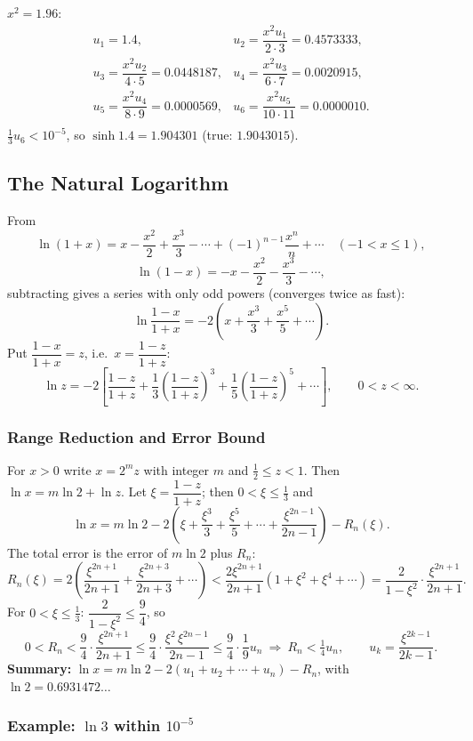\documentclass[hidelinks]{article}
\begin{document}
$x^2=1.96$:
\[
\begin{array}{ll}
u_1=1.4, & u_2=\dfrac{x^2u_1}{2\cdot3}=0.4573333,\\[4pt]
u_3=\dfrac{x^2u_2}{4\cdot5}=0.0448187, & u_4=\dfrac{x^2u_3}{6\cdot7}=0.0020915,\\[4pt]
u_5=\dfrac{x^2u_4}{8\cdot9}=0.0000569, & u_6=\dfrac{x^2u_5}{10\cdot11}=0.0000010.\\
\end{array}
\]
$\tfrac13u_6<10^{-5}$, so $\sinh1.4=1.904301$ (true: $1.9043015$).

\subsection{The Natural Logarithm}

From
\[
\ln(1+x)=x-\frac{x^2}2+\frac{x^3}3-\cdots+(-1)^{n-1}\frac{x^n}n+\cdots\quad(-1<x\le1),
\]
\[
\ln(1-x)=-x-\frac{x^2}2-\frac{x^3}3-\cdots,
\]
subtracting gives a series with only odd powers (converges twice as fast):
\[
\ln\frac{1-x}{1+x}=-2\left(x+\frac{x^3}3+\frac{x^5}5+\cdots\right).
\]
Put $\dfrac{1-x}{1+x}=z$, i.e.\ $x=\dfrac{1-z}{1+z}$:
\[
\ln z=-2\left[\frac{1-z}{1+z}+\frac13\left(\frac{1-z}{1+z}\right)^3+\frac15\left(\frac{1-z}{1+z}\right)^5+\cdots\right],\qquad 0<z<\infty .
\]

\subsubsection{Range Reduction and Error Bound}

For $x>0$ write $x=2^m z$ with integer $m$ and $\frac12\le z<1$. Then $\ln x=m\ln2+\ln z$. Let $\xi=\dfrac{1-z}{1+z}$; then $0<\xi\le\frac13$ and
\[
\ln x=m\ln2-2\left(\xi+\frac{\xi^3}3+\frac{\xi^5}5+\cdots+\frac{\xi^{2n-1}}{2n-1}\right)-R_n(\xi).
\]
The total error is the error of $m\ln2$ plus $R_n$:
\[
R_n(\xi)=2\left(\frac{\xi^{2n+1}}{2n+1}+\frac{\xi^{2n+3}}{2n+3}+\cdots\right)
<\frac{2\xi^{2n+1}}{2n+1}(1+\xi^2+\xi^4+\cdots)=\frac{2}{1-\xi^2}\cdot\frac{\xi^{2n+1}}{2n+1}.
\]
For $0<\xi\le\frac13$: $\dfrac{2}{1-\xi^2}\le\dfrac94$, so
\[
0<R_n<\frac94\cdot\frac{\xi^{2n+1}}{2n+1}\le\frac94\cdot\frac{\xi^2\,\xi^{2n-1}}{2n-1}\le\frac94\cdot\frac19u_n\ \Longrightarrow\ \boxed{R_n<\tfrac14u_n},\qquad u_k=\frac{\xi^{2k-1}}{2k-1}.
\]
\textbf{Summary:} $\ln x=m\ln2-2(u_1+u_2+\cdots+u_n)-R_n$, with $\ln2=0.6931472\ldots$

\subsubsection{Example: $\ln3$ within $10^{-5}$}
\end{document}
